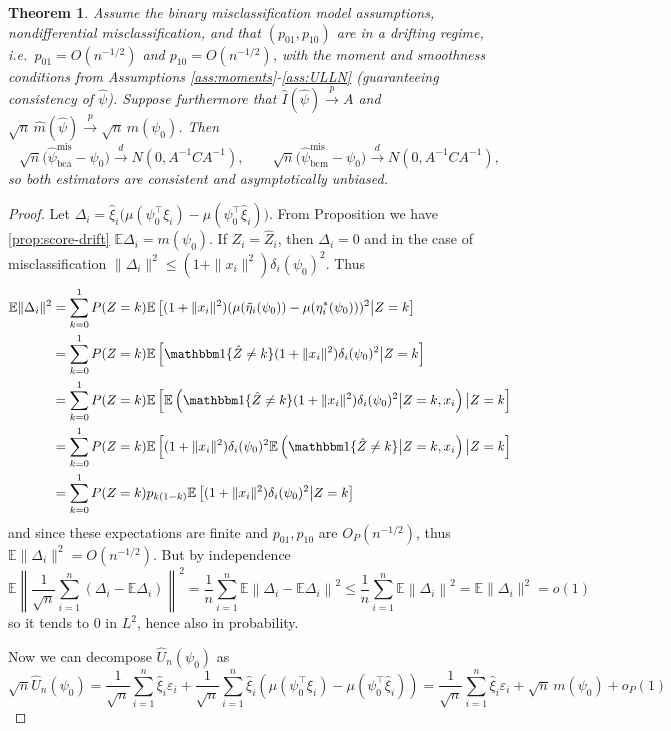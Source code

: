 \documentclass[11pt]{article}
\newtheorem{theorem}{Theorem}
\theoremstyle{definition}
\theoremstyle{remark}
\newcommand{\E}{\mathbb{E}}
\newcommand{\toP}{\xrightarrow{\,p\,}}
\newcommand{\tod}{\xrightarrow{\,d\,}}
\begin{document}
\begin{theorem}\label{thm:mis-bc}
Assume the binary misclassification model assumptions, nondifferential misclassification, and that $(p_{01},p_{10})$ are in a drifting regime,
i.e.\ $p_{01}=O(n^{-1/2})$ and $p_{10}=O(n^{-1/2})$, with the moment and smoothness conditions from Assumptions \ref{ass:moments}-\ref{ass:ULLN} (guaranteeing consistency of $\hat\psi$). Suppose furthermore that
$\hat I(\hat\psi)\toP A$ and $\sqrt{n}\,\hat m(\hat\psi)\toP \sqrt{n}\,m(\psi_0)$.
Then
\[
\sqrt{n}\big(\hat\psi^{\mathrm{mis}}_{\mathrm{bca}}-\psi_0\big)\tod N(0,A^{-1}CA^{-1}),
\qquad
\sqrt{n}\big(\hat\psi^{\mathrm{mis}}_{\mathrm{bcm}}-\psi_0\big)\tod N(0,A^{-1}CA^{-1}),
\]
so both estimators are consistent and asymptotically unbiased.
\end{theorem}

\begin{proof}
Let $\Delta_i = \hat\xi_i\big( \mu(\psi_0^\top\xi_i) - \mu(\psi_0^\top \hat\xi_i)\big)$. From Proposition we have \ref{prop:score-drift} $\E \Delta_i = m(\psi_0).$ If $Z_i=\hat Z_i$, then $\Delta_i = 0$ and in the case of misclassification $\|\Delta_i \|^2 \leq (1+\|x_i\|^2)\delta_i(\psi_0)^2.$ Thus
\[\begin{split}
\E \| \Delta_i \|^2 &= \sum_{k=0}^1 P(Z=k) \E \left[(1+\|x_i\|^2)(\mu(\tilde\eta_i(\psi_0)) - \mu(\eta^*_i(\psi_0)))^2\big| Z=k\right] \\
&=\sum_{k=0}^1P(Z=k)\E \left[ \mathbbm 1\{\hat Z\neq k \} (1+\|x_i\|^2)\delta_i(\psi_0)^2 \big| Z=k \right] \\
&=\sum_{k=0}^1P(Z=k)\E \left[ \E \left(\mathbbm 1\{\hat Z\neq k \} (1+\|x_i\|^2)\delta_i(\psi_0)^2\big| Z=k, x_i \right) \big| Z=k \right] \\
&=\sum_{k=0}^1P(Z=k)\E \left[ (1+\|x_i\|^2)\delta_i(\psi_0)^2 \E \left(\mathbbm 1\{\hat Z\neq k \}\big| Z=k, x_i \right) \big| Z=k \right] \\
&=\sum_{k=0}^1P(Z=k)p_{k(1-k)}\E \left[(1+\|x_i\|^2)\delta_i(\psi_0)^2 \big| Z=k \right]
\end{split}\]
and since these expectations are finite and $p_{01}, p_{10}$ are $O_P(n^{-1/2})$, thus $\E \|\Delta_i \|^2 = O(n^{-1/2})$. But by independence
\[ \E \left\| \frac{1}{\sqrt n} \sum_{i=1}^n(\Delta_i - \E \Delta_i) \right\|^2 = \frac{1}{n} \sum_{i=1}^n\E \left\|\Delta_i - \E \Delta_i \right\|^2 \leq \frac{1}{n} \sum_{i=1}^n\E \left\|\Delta_i \right\|^2 = \E \|\Delta_i \|^2 = o(1) \]
so it tends to 0 in $L^2$, hence also in probability.

Now we can decompose $\hat U_n(\psi_0)$ as
\[ \sqrt n \hat U_n(\psi_0) = \frac{1}{\sqrt n} \sum_{i=1}^n\hat\xi_i \varepsilon_i + \frac{1}{\sqrt n } \sum_{i=1}^n\hat\xi_i(\mu (\psi_0^\top \xi_i) - \mu(\psi_0^\top \hat\xi_i)) = \frac{1}{\sqrt n} \sum_{i=1}^n\hat\xi_i \varepsilon_i + \sqrt{n}\,m(\psi_0) + o_P(1) \]


\end{proof}
\end{document}

